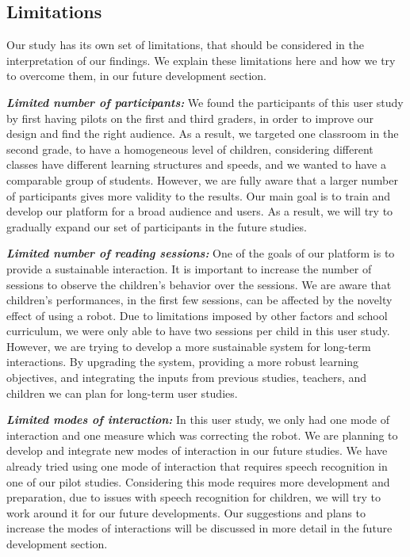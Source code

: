 \documentclass{sigchi}
\begin{document}
\subsection{Limitations}
Our study has its own set of limitations, that should be considered in the interpretation of our findings. 
We explain these limitations here and how we try to overcome them, in our future development section.

\textbf{\textit{Limited number of participants:}}
We found the participants of this user study by first having pilots on the first and third graders, in order to improve our design and find the right audience.
As a result, we targeted one classroom in the second grade, to have a homogeneous level of children, considering different classes have different learning structures and speeds, and we wanted to have a comparable group of students.
However, we are fully aware that a larger number of participants gives more validity to the results. 
Our main goal is to train and develop our platform for a broad audience and users.
As a result, we will try to gradually expand our set of participants in the future studies.

\textbf{\textit{Limited number of reading sessions:}}
One of the goals of our platform is to provide a sustainable interaction. 
It is important to increase the number of sessions to observe the children's behavior over the sessions.
We are aware that children's performances, in the first few sessions, can be affected by the novelty effect of using a robot.
Due to limitations imposed by other factors and school curriculum, we were only able to have two sessions per child in this user study.
However, we are trying to develop a more sustainable system for long-term interactions.
By upgrading the system, providing a more robust learning objectives, and integrating the inputs from previous studies, teachers, and children we can plan for long-term user studies.

\textbf{\textit{Limited modes of interaction:}}
In this user study, we only had one mode of interaction and one measure which was correcting the robot. 
We are planning to develop and integrate new modes of interaction in our future studies.
We have already tried using one mode of interaction that requires speech recognition in one of our pilot studies. 
Considering this mode requires more development and preparation, due to issues with speech recognition for children, we will try to work around it for our future developments.
Our suggestions and plans to increase the modes of interactions will be discussed in more detail in the future development section.
\end{document}
